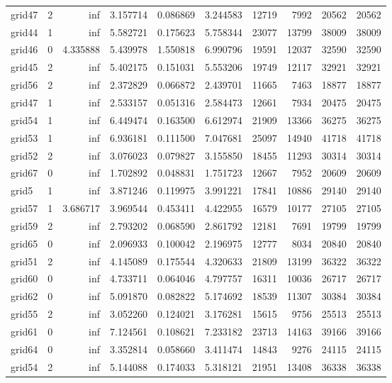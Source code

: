 \begin{longtable}{|l|r|r|r|r|r|r|r|r|r|}
grid47 & 2 & inf & 3.157714 & 0.086869 & 3.244583 & 12719 & 7992 & 20562 & 20562 \\
grid44 & 1 & inf & 5.582721 & 0.175623 & 5.758344 & 23077 & 13799 & 38009 & 38009 \\
grid46 & 0 & 4.335888 & 5.439978 & 1.550818 & 6.990796 & 19591 & 12037 & 32590 & 32590 \\
grid45 & 2 & inf & 5.402175 & 0.151031 & 5.553206 & 19749 & 12117 & 32921 & 32921 \\
grid56 & 2 & inf & 2.372829 & 0.066872 & 2.439701 & 11665 & 7463 & 18877 & 18877 \\
grid47 & 1 & inf & 2.533157 & 0.051316 & 2.584473 & 12661 & 7934 & 20475 & 20475 \\
grid54 & 1 & inf & 6.449474 & 0.163500 & 6.612974 & 21909 & 13366 & 36275 & 36275 \\
grid53 & 1 & inf & 6.936181 & 0.111500 & 7.047681 & 25097 & 14940 & 41718 & 41718 \\
grid52 & 2 & inf & 3.076023 & 0.079827 & 3.155850 & 18455 & 11293 & 30314 & 30314 \\
grid67 & 0 & inf & 1.702892 & 0.048831 & 1.751723 & 12667 & 7952 & 20609 & 20609 \\
grid5 & 1 & inf & 3.871246 & 0.119975 & 3.991221 & 17841 & 10886 & 29140 & 29140 \\
grid57 & 1 & 3.686717 & 3.969544 & 0.453411 & 4.422955 & 16579 & 10177 & 27105 & 27105 \\
grid59 & 2 & inf & 2.793202 & 0.068590 & 2.861792 & 12181 & 7691 & 19799 & 19799 \\
grid65 & 0 & inf & 2.096933 & 0.100042 & 2.196975 & 12777 & 8034 & 20840 & 20840 \\
grid51 & 2 & inf & 4.145089 & 0.175544 & 4.320633 & 21809 & 13199 & 36322 & 36322 \\
grid60 & 0 & inf & 4.733711 & 0.064046 & 4.797757 & 16311 & 10036 & 26717 & 26717 \\
grid62 & 0 & inf & 5.091870 & 0.082822 & 5.174692 & 18539 & 11307 & 30384 & 30384 \\
grid55 & 2 & inf & 3.052260 & 0.124021 & 3.176281 & 15615 & 9756 & 25513 & 25513 \\
grid61 & 0 & inf & 7.124561 & 0.108621 & 7.233182 & 23713 & 14163 & 39166 & 39166 \\
grid64 & 0 & inf & 3.352814 & 0.058660 & 3.411474 & 14843 & 9276 & 24115 & 24115 \\
grid54 & 2 & inf & 5.144088 & 0.174033 & 5.318121 & 21951 & 13408 & 36338 & 36338 \\

\end{longtable}
